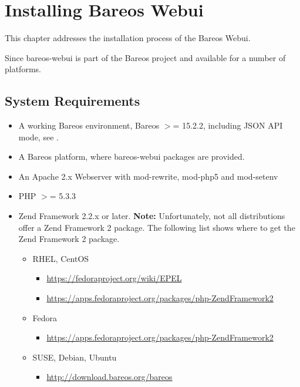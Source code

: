 
\chapter{Installing Bareos Webui}
\label{sec:webui}
\label{sec:install-webui}

This chapter addresses the installation process of the Bareos Webui.

Since  bareos-webui is part of the Bareos project and available for a number of platforms.


\section{System Requirements}

\begin{itemize}
\item A working Bareos environment, Bareos $>$= 15.2.2, including JSON API mode, see .
\item A Bareos platform, where bareos-webui packages are provided.
\item An Apache 2.x Webserver with mod-rewrite, mod-php5 and mod-setenv
\item PHP $>$= 5.3.3
\item Zend Framework 2.2.x or later.
  \textbf{Note:} Unfortunately, not all distributions offer a Zend Framework 2 package.
  The following list shows where to get the Zend Framework 2 package.
  \begin{itemize}
  \item RHEL, CentOS
    \begin{itemize}
    \item \url{https://fedoraproject.org/wiki/EPEL}
    \item \url{https://apps.fedoraproject.org/packages/php-ZendFramework2}
    \end{itemize}

  \item Fedora
    \begin{itemize}
    \item \url{https://apps.fedoraproject.org/packages/php-ZendFramework2}
    \end{itemize}

  \item SUSE, Debian, Ubuntu
    \begin{itemize}
    \item \url{http://download.bareos.org/bareos}
    \end{itemize}
  \end{itemize}
\end{itemize}


